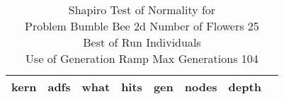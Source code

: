 \begin{table}[H]
\caption{Shapiro Test of Normality for \\ Problem  Bumble Bee 2d  Number of Flowers 25\\Best of Run Individuals \\ Use of Generation Ramp  Max Generations 104\\}
\begin{center}
\scalebox{0.8} %
{
\begin{tabular}{lrrrrrrr}
\hline
kern & adfs & what & hits & gen & nodes & depth \\
\hline


\end{tabular}
}
\end{center}
\end{table}

